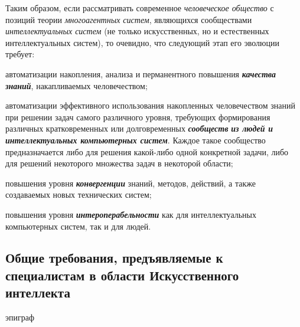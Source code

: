 Таким образом, если рассматривать современное \textit{человеческое общество} с позиций теории \textit{многоагентных систем}, являющихся сообществами \textit{интеллектуальных систем} (не только искусственных, но и естественных интеллектуальных систем), то очевидно, что следующий этап его эволюции требует:
\begin{textitemize}
	\item автоматизации накопления, анализа и перманентного повышения \textbf{\textit{качества знаний}}, накапливаемых человечеством;
	\item автоматизации эффективного использования накопленных человечеством знаний при решении задач самого различного уровня, требующих формирования различных кратковременных или долговременных \textbf{\textit{сообществ}} \textbf{\textit{из людей и интеллектуальных компьютерных систем}}. Каждое такое сообщество предназначается либо для решения какой-либо одной конкретной задачи, либо для решений некоторого множества задач в некоторой области;
	\item повышения уровня \textbf{\textit{конвергенции}} знаний, методов, действий, а также создаваемых новых технических систем;
	\item повышения уровня \textbf{\textit{интероперабельности}} как для интеллектуальных компьютерных систем, так и для людей.
\end{textitemize}

\subsection*{Общие требования, предъявляемые к специалистам в области Искусственного интеллекта}

\begin{SCn}
	\begin{scnrelfromlist}{эпиграф}
	\end{scnrelfromlist}
\end{SCn}

